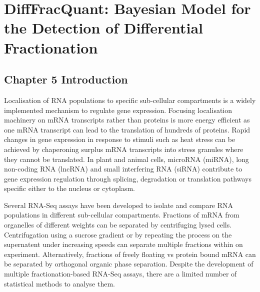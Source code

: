 \documentclass[../main.tex]{subfiles}
\begin{document}
\chapter{{DiffFracQuant: Bayesian Model for the Detection of Differential Fractionation}}

\section{Chapter 5 Introduction}






Localisation of RNA populations to specific sub-cellular compartments is a widely implemented mechanism to regulate gene expression.
Focusing localisation machinery on mRNA transcripts rather than proteins is more energy efficient as one mRNA transcript can lead to the translation of hundreds of proteins.
Rapid changes in gene expression in response to stimuli such as heat stress can be achieved by chaperoning surplus mRNA transcripts into stress granules where they cannot be translated.
In plant and animal cells, microRNA (miRNA), long non-coding RNA (lncRNA) and small interfering RNA (siRNA) contribute to gene expression regulation through splicing, degradation or translation pathways specific either to the nucleus or cytoplasm.

Several RNA-Seq assays have been developed to isolate and compare RNA populations in different sub-cellular compartments.
Fractions of mRNA from organelles of different weights can be separated by centrifuging lysed cells. 
Centrifugation using a sucrose gradient or by repeating the process on the supernatent under increasing speeds can separate multiple fractions within on experiment.
Alternatively, fractions of freely floating vs protein bound mRNA can be separated by orthogonal organic phase separation. 
Despite the development of multiple fractionation-based RNA-Seq assays, there are a limited number of statistical methods to analyse them.
\end{document}
